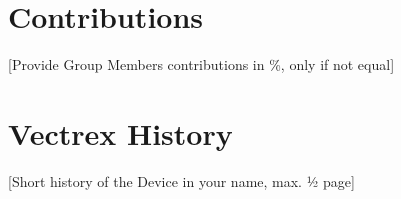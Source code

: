 \section*{Contributions}

[Provide Group Members contributions in \%, only if not equal]

\section*{Vectrex History}
[Short history of the Device in your name, max. ½ page]